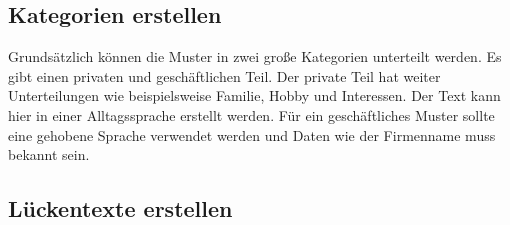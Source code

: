 	\subsection{Kategorien erstellen}
	Grundsätzlich können die Muster in zwei große Kategorien unterteilt werden. Es gibt einen privaten und geschäftlichen Teil. Der private Teil hat weiter Unterteilungen wie beispielsweise Familie, Hobby und Interessen. Der Text kann hier in einer Alltagssprache erstellt werden. Für ein geschäftliches Muster sollte eine gehobene Sprache verwendet werden und Daten wie der Firmenname muss bekannt sein. 
	\subsection{Lückentexte erstellen}
	